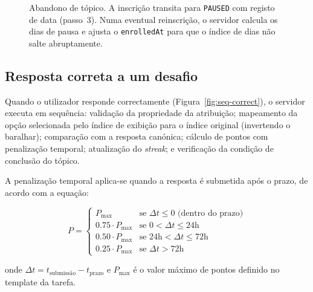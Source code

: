 \begin{figure}[H]
	\caption[Sequ\^encia de abandono de t\'opico]{Abandono de t\'opico. A inscri\c{c}\~ao transita para \texttt{PAUSED} com registo de data (passo~3). Numa eventual reinscrição, o servidor calcula os dias de pausa e ajusta o \texttt{enrolledAt} para que o \'indice de dias n\~ao salte abruptamente.}
	\label{fig:seq-leave}
\end{figure}

\subsection{Resposta correta a um desafio}
\label{ssec:seq-correct}

Quando o utilizador responde correctamente (Figura~\ref{fig:seq-correct}), o
servidor executa em sequ\^encia: valida\c{c}\~ao da propriedade da atribui\c{c}\~ao;
mapeamento da op\c{c}\~ao selecionada pelo \'indice de exibi\c{c}\~ao para o
\'indice original (invertendo o baralhar); compara\c{c}\~ao com a resposta
can\'onica; c\'alculo de pontos com penaliza\c{c}\~ao temporal; atualiza\c{c}\~ao
do \emph{streak}; e verifica\c{c}\~ao da condi\c{c}\~ao de conclus\~ao do t\'opico.

A penaliza\c{c}\~ao temporal aplica-se quando a resposta \'e submetida ap\'os o
prazo, de acordo com a equa\c{c}\~ao:

\begin{equation}
	P = \begin{cases}
		P_{\max} & \text{se } \Delta t \leq 0 \text{ (dentro do prazo)} \\
		0.75 \cdot P_{\max} & \text{se } 0 < \Delta t \leq 24\text{h} \\
		0.50 \cdot P_{\max} & \text{se } 24\text{h} < \Delta t \leq 72\text{h} \\
		0.25 \cdot P_{\max} & \text{se } \Delta t > 72\text{h}
	\end{cases}
	\label{eq:penalizacao-temporal}
\end{equation}

onde $\Delta t = t_{\text{submiss\~ao}} - t_{\text{prazo}}$ e $P_{\max}$ \'e
o valor m\'aximo de pontos definido no template da tarefa.

